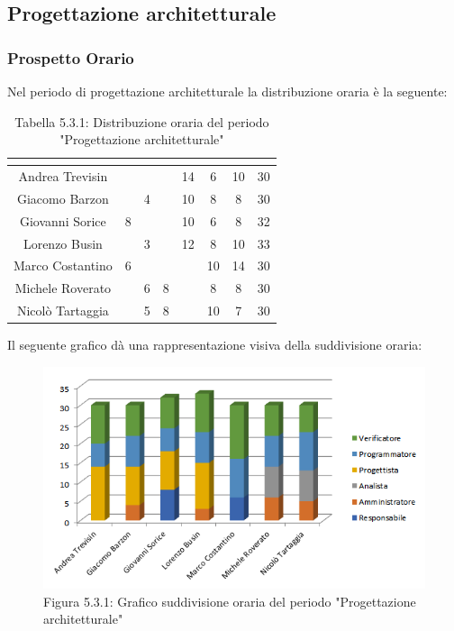 \subsection{Progettazione architetturale}

\subsubsection{Prospetto Orario}
Nel periodo di progettazione architetturale la distribuzione oraria è la seguente:

\renewcommand{\arraystretch}{1.5}
\begin{table}[H]
\begin{center}
\begin{tabular}{|c|c|c|c|c|c|c|c|}
\hline
\rowcolor{title_row}
\textbf{\color{title_text}{Nome}} & \textbf{\color{title_text}{Resp.}} & \textbf{\color{title_text}{Ammi.}} & \textbf{\color{title_text}{Analist.}} & \textbf{\color{title_text}{Progett.}} & \textbf{\color{title_text}{Program.}} & \textbf{\color{title_text}{Verific.}} & \textbf{\color{title_text}{Totale}} \\ \hline
Andrea Trevisin  & & & & 14 & 6 & 10 & 30 \\ \hline
Giacomo Barzon   &  & 4 &  & 10 & 8 & 8 & 30\\ \hline
Giovanni Sorice  & 8 &  &  & 10 & 6 & 8 & 32\\ \hline
Lorenzo Busin    &  & 3  &  & 12 & 8 & 10 & 33\\ \hline
Marco Costantino & 6 &  &  &  & 10 & 14 & 30\\ \hline
Michele Roverato &  & 6 & 8 &  & 8 & 8 & 30\\ \hline
Nicolò Tartaggia &  & 5  & 8 &  & 10 & 7 & 30\\ \hline
\end{tabular}
\caption{Tabella 5.3.1: Distribuzione oraria del periodo "Progettazione architetturale"\label{}}
\end{center}
\end{table}
\renewcommand{\arraystretch}{1}

Il seguente grafico dà una rappresentazione visiva della suddivisione oraria: \\
\begin{figure} [H]
	\centering
	\includegraphics[scale=1]{Res/ExcelGrafici/Grafici/ProgettazioneOre.png}
	\caption{Figura 5.3.1: Grafico suddivisione oraria del periodo "Progettazione architetturale"}\label{}
\end{figure}


